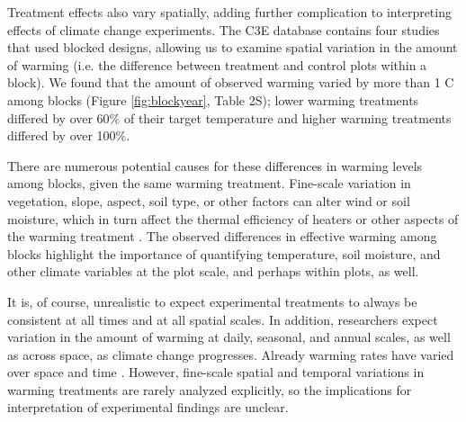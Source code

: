 \documentclass{article}
\begin{document}
\par Treatment effects also vary spatially, adding further complication to interpreting effects of climate change experiments. The C3E database contains four studies that used blocked designs, allowing us to examine spatial variation in the amount of warming (i.e. the difference between treatment and control plots within a block). We found that the amount of observed warming varied by more than 1 \degree C among blocks (Figure \ref{fig:blockyear}, Table 2S); lower warming treatments differed by over 60\% of their target temperature and higher warming treatments differed by over 100\%. %
\par There are numerous potential causes for these differences in warming levels among blocks, given the same warming treatment. Fine-scale variation in vegetation, slope, aspect, soil type, or other factors can alter wind or soil moisture, which in turn affect the thermal efficiency of heaters or other aspects of the warming treatment \citep{peterjohn1993,kimball2005,kimball2008,hoeppner2012,rollinson2015}. The observed differences in effective warming among blocks highlight the importance of quantifying temperature, soil moisture, and other climate variables at the plot scale, and perhaps within plots, as well. 

\par It is, of course, unrealistic to expect experimental treatments to always be consistent at all times and at all spatial scales. In addition, researchers expect variation in the amount of warming at daily, seasonal, and annual scales, as well as across space, as climate change progresses. Already warming rates have varied over space and time \citep{ipcc2013}. However, fine-scale spatial and temporal variations in warming treatments are rarely analyzed explicitly, so the implications for interpretation of experimental findings are unclear. %
\end{document}
